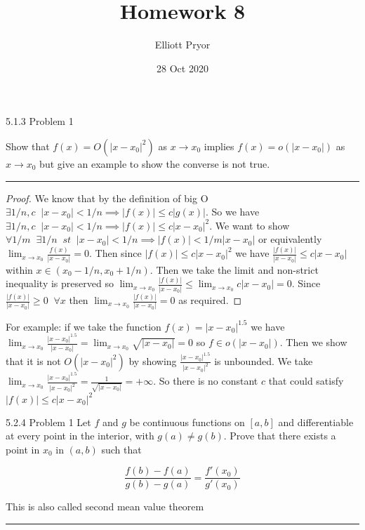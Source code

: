 \documentclass[11pt]{article}
\title{Homework 8}
\author{Elliott Pryor}
\date{28 Oct 2020}
\renewcommand{\sp}{\; \;}
\begin{document}
\maketitle

 5.1.3 Problem 1

Show that $f(x) = O(|x - x_0|^2)$ as $x \to x_0$ implies $f(x) = o(|x - x_0|)$ as $x\to x_0$ but give an example to show the converse is not true.

\hrule

\begin{proof}

We know that by the definition of big O $\exists 1/n, c \sp |x - x_0| < 1/n \implies |f(x)| \leq c |g(x)|$. So we have $\exists 1/n, c \sp |x - x_0| < 1/n \implies |f(x)| \leq c |x - x_0|^2$. 
We want to show $\forall 1/m \sp \exists 1/n \sp st \sp |x - x_0| < 1/n \implies |f(x)| < 1/m |x - x_0|$ or equivalently $\lim_{x \to x_0} \frac{f(x)}{|x - x_0|} = 0$. 
Then since $|f(x)| \leq c |x - x_0|^2$ we have $\frac{|f(x)|}{|x - x_0|} \leq c |x - x_0|$ within $x \in (x_0 - 1/n, x_0 + 1/n)$. Then we take the limit and non-strict inequality is preserved so $\lim_{x \to x_0} \frac{|f(x)|}{|x - x_0|} \leq \lim_{x \to x_0} c |x - x_0| = 0$. Since $\frac{|f(x)|}{|x - x_0|} \geq 0 \sp \forall x$ then $\lim_{x \to x_0} \frac{|f(x)|}{|x - x_0|} = 0$ as required.
\end{proof}

For example: if we take the function $f(x) = |x - x_0|^{1.5}$ we have $\lim_{x \to x_0} \frac{|x - x_0|^{1.5}}{|x - x_0|} = \lim_{x \to x_0} \sqrt{|x - x_0|} = 0$ so $f \in o(|x - x_0|)$. 
Then we show that it is not $O(|x-x_0|^2)$ by showing $\frac{|x - x_0|^{1.5}}{|x - x_0|^{2}}$ is unbounded.
 We take $\lim_{x \to x_0} \frac{|x - x_0|^{1.5}}{|x - x_0|^{2}} = \frac{1}{\sqrt{|x-x_0|}} = + \infty$. So there is no constant $c$ that could satisfy $|f(x)| \leq c |x - x_0|^2$


 5.2.4 Problem 1
Let $f$ and $g$ be continuous functions on $[a,b]$ and differentiable at every point in the interior, with $g(a) \neq g(b)$. Prove that there exists a point in $x_0$ in $(a,b)$ such that

$$\frac{f(b) - f(a)}{g(b)-g(a)} = \frac{f'(x_0)}{g'(x_0)}$$

This is also called second mean value theorem

\hrule
\end{document}
